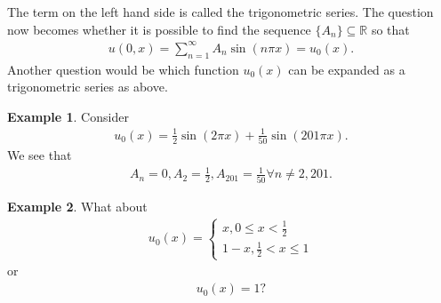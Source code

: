 \documentclass{article}
\theoremstyle{definition}
\newtheorem{exmp}{Example}[section]
\newcommand{\R}{\mathbb{R}}
\begin{document}
The term on the left hand side is called the trigonometric series. The question now becomes whether it is possible to find the sequence $\{ A_n\} \subseteq \R$ so that
\begin{align*}
u(0,x) = \sum_{n=1}^\infty A_n \sin (n \pi x) = u_0(x).
\end{align*}
Another question would be which function $u_0(x)$ can be expanded as a trigonometric series as above.

\begin{exmp}
	Consider
	\begin{align*}
	u_0(x) = \frac{1}{2}\sin(2\pi x) + \frac{1}{50}\sin(201\pi x).
	\end{align*}
	We see that
	\begin{align*}
	A_n = 0, A_2 = \frac{1}{2}, A_{201} = \frac{1}{50} \forall n\neq 2,201.
	\end{align*}
\end{exmp}

\begin{exmp}
	What about
	\begin{align*}
	u_0(x) = \begin{cases}
	x, 0\leq x < \frac{1}{2}\\
	1-x, \frac{1}{2} < x \leq 1
	\end{cases}
	\end{align*}
	or
	\begin{align*}
	u_0(x) = 1?
	\end{align*}
\end{exmp}
\end{document}
